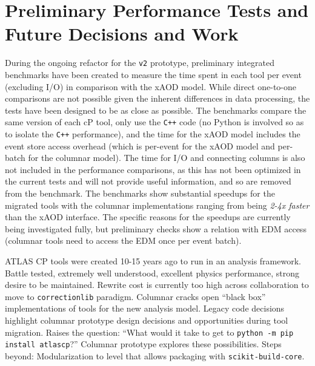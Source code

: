 \section{Preliminary Performance Tests and Future Decisions and Work}\label{sec:conclusions}

During the ongoing refactor for the \texttt{v2} prototype, preliminary integrated benchmarks have been created to measure the time spent in each tool per event (excluding I/O) in comparison with the xAOD model.
While direct one-to-one comparisons are not possible given the inherent differences in data processing, the tests have been designed to be as close as possible.
The benchmarks compare the same version of each cP tool, only use the \texttt{C++} code (no Python is involved so as to isolate the \texttt{C++} performance), and the time for the xAOD model includes the event store access overhead (which is per-event for the xAOD model and per-batch for the columnar model).
The time for I/O and connecting columns is also not included in the performance comparisons, as this has not been optimized in the current tests and will not provide useful information, and so are removed from the benchmark.
The benchmarks show substantial speedups for the migrated tools with the columnar implementations ranging from being \emph{2-4x faster} than the xAOD interface.
The specific reasons for the speedups are currently being investigated fully, but preliminary checks show a relation with EDM access (columnar tools need to access the EDM once per event batch).

ATLAS CP tools were created 10-15 years ago to run in an analysis framework.
Battle tested, extremely well understood, excellent physics performance, strong desire to be maintained.
Rewrite cost is currently too high across collaboration to move to \texttt{correctionlib} paradigm.
Columnar cracks open ``black box'' implementations of tools for the new analysis model.
Legacy code decisions highlight columnar prototype design decisions and opportunities during tool migration.
Raises the question: ``What would it take to get to \texttt{python -m pip install atlascp}?''
Columnar prototype explores these possibilities.
Steps beyond: Modularization to level that allows packaging with \texttt{scikit-build-core}.
